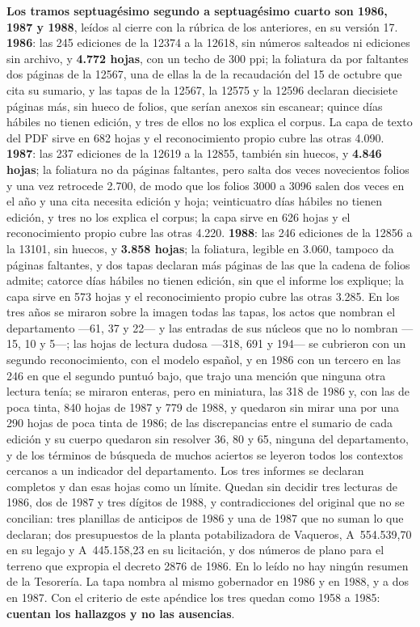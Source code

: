 \textbf{Los tramos septuagésimo segundo a septuagésimo cuarto son 1986, 1987 y 1988}, leídos al cierre con la rúbrica de los anteriores, en su versión 17. \textbf{1986}: las 245 ediciones de la 12374 a la 12618, sin números salteados ni ediciones sin archivo, y \textbf{4.772 hojas}, con un techo de 300 ppi; la foliatura da por faltantes dos páginas de la 12567, una de ellas la de la recaudación del 15 de octubre que cita su sumario, y las tapas de la 12567, la 12575 y la 12596 declaran diecisiete páginas más, sin hueco de folios, que serían anexos sin escanear; quince días hábiles no tienen edición, y tres de ellos no los explica el corpus. La capa de texto del PDF sirve en 682 hojas y el reconocimiento propio cubre las otras 4.090. \textbf{1987}: las 237 ediciones de la 12619 a la 12855, también sin huecos, y \textbf{4.846 hojas}; la foliatura no da páginas faltantes, pero salta dos veces novecientos folios y una vez retrocede 2.700, de modo que los folios 3000 a 3096 salen dos veces en el año y una cita necesita edición y hoja; veinticuatro días hábiles no tienen edición, y tres no los explica el corpus; la capa sirve en 626 hojas y el reconocimiento propio cubre las otras 4.220. \textbf{1988}: las 246 ediciones de la 12856 a la 13101, sin huecos, y \textbf{3.858 hojas}; la foliatura, legible en 3.060, tampoco da páginas faltantes, y dos tapas declaran más páginas de las que la cadena de folios admite; catorce días hábiles no tienen edición, sin que el informe los explique; la capa sirve en 573 hojas y el reconocimiento propio cubre las otras 3.285. En los tres años se miraron sobre la imagen todas las tapas, los actos que nombran el departamento ---61, 37 y 22--- y las entradas de sus núcleos que no lo nombran ---15, 10 y 5---; las hojas de lectura dudosa ---318, 691 y 194--- se cubrieron con un segundo reconocimiento, con el modelo español, y en 1986 con un tercero en las 246 en que el segundo puntuó bajo, que trajo una mención que ninguna otra lectura tenía; se miraron enteras, pero en miniatura, las 318 de 1986 y, con las de poca tinta, 840 hojas de 1987 y 779 de 1988, y quedaron sin mirar una por una 290 hojas de poca tinta de 1986; de las discrepancias entre el sumario de cada edición y su cuerpo quedaron sin resolver 36, 80 y 65, ninguna del departamento, y de los términos de búsqueda de muchos aciertos se leyeron todos los contextos cercanos a un indicador del departamento. Los tres informes se declaran completos y dan esas hojas como un límite. Quedan sin decidir tres lecturas de 1986, dos de 1987 y tres dígitos de 1988, y contradicciones del original que no se concilian: tres planillas de anticipos de 1986 y una de 1987 que no suman lo que declaran; dos presupuestos de la planta potabilizadora de Vaqueros, A~554.539,70 en su legajo y A~445.158,23 en su licitación, y dos números de plano para el terreno que expropia el decreto 2876 de 1986. En lo leído no hay ningún resumen de la Tesorería. La tapa nombra al mismo gobernador en 1986 y en 1988, y a dos en 1987. Con el criterio de este apéndice los tres quedan como 1958 a 1985: \textbf{cuentan los hallazgos y no las ausencias}.
